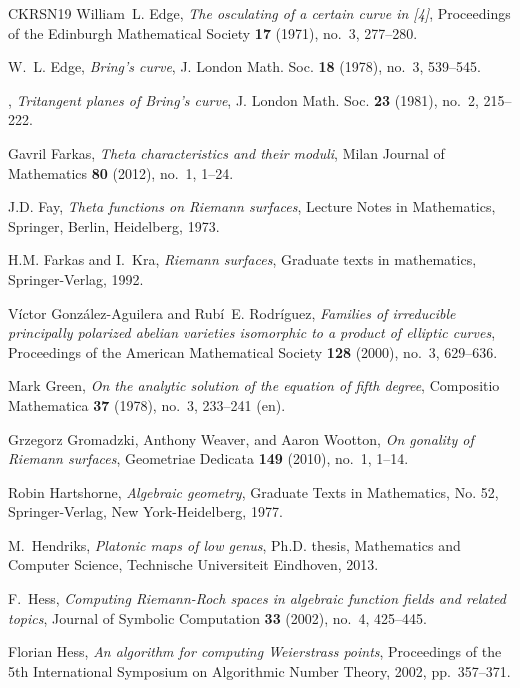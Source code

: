 \documentclass{amsart}
\begin{document}
\begin{thebibliography}{CKRSN19}
William~L. Edge, \emph{The osculating of a certain curve in [4]}, Proceedings
  of the Edinburgh Mathematical Society \textbf{17} (1971), no.~3, 277--280.

W.~L. Edge, \emph{Bring's curve}, J. London Math. Soc. \textbf{18} (1978),
  no.~3, 539--545.

\bysame, \emph{Tritangent planes of {B}ring's curve}, J. London Math. Soc.
  \textbf{23} (1981), no.~2, 215--222.

Gavril Farkas, \emph{Theta characteristics and their moduli}, Milan Journal of
  Mathematics \textbf{80} (2012), no.~1, 1--24.

J.D. Fay, \emph{Theta functions on {R}iemann surfaces}, Lecture Notes in
  Mathematics, Springer, Berlin, Heidelberg, 1973.

H.M. Farkas and I.~Kra, \emph{Riemann surfaces}, Graduate texts in mathematics,
  Springer-Verlag, 1992.

Víctor González-Aguilera and Rubí~E. Rodríguez, \emph{Families of
  irreducible principally polarized abelian varieties isomorphic to a product
  of elliptic curves}, Proceedings of the American Mathematical Society
  \textbf{128} (2000), no.~3, 629--636.

Mark Green, \emph{On the analytic solution of the equation of fifth degree},
  Compositio Mathematica \textbf{37} (1978), no.~3, 233--241 (en). 

Grzegorz Gromadzki, Anthony Weaver, and Aaron Wootton, \emph{On gonality of
  {R}iemann surfaces}, Geometriae Dedicata \textbf{149} (2010), no.~1, 1--14.

Robin Hartshorne, \emph{Algebraic geometry}, Graduate Texts in Mathematics, No.
  52, Springer-Verlag, New York-Heidelberg, 1977.

M.~Hendriks, \emph{Platonic maps of low genus}, Ph.D. thesis, Mathematics and
  Computer Science, Technische Universiteit Eindhoven, 2013.

F.~Hess, \emph{Computing {R}iemann-{R}och spaces in algebraic function fields
  and related topics}, Journal of Symbolic Computation \textbf{33} (2002),
  no.~4, 425--445.

Florian Hess, \emph{An algorithm for computing {W}eierstrass points},
  Proceedings of the 5th International Symposium on Algorithmic Number Theory,
  2002, pp.~357--371.


\end{thebibliography}
\end{document}
